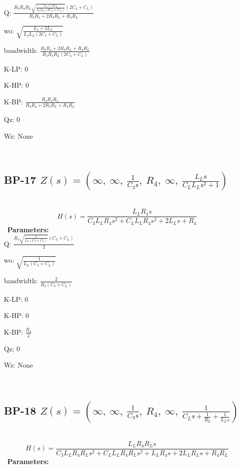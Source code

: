 \documentclass{article}
\begin{document}
Q: $\frac{R_{3} R_{4} R_{L} \sqrt{\frac{L_{4} + 2 L_{L}}{L_{4} L_{L} \left(2 C_{4} + C_{L}\right)}} \left(2 C_{4} + C_{L}\right)}{R_{3} R_{4} + 2 R_{3} R_{L} + R_{4} R_{L}}$\ 

wo: $\sqrt{\frac{L_{4} + 2 L_{L}}{L_{4} L_{L} \left(2 C_{4} + C_{L}\right)}}$\ 

bandwidth: $\frac{R_{3} R_{4} + 2 R_{3} R_{L} + R_{4} R_{L}}{R_{3} R_{4} R_{L} \left(2 C_{4} + C_{L}\right)}$\ 

K-LP: $0$\ 

K-HP: $0$\ 

K-BP: $\frac{R_{3} R_{4} R_{L}}{R_{3} R_{4} + 2 R_{3} R_{L} + R_{4} R_{L}}$\ 

Qz: $0$\ 

Wz: $\text{None}$\ 

\ 

\subsection{BP-17 $Z(s) = \left( \infty, \  \infty, \  \frac{1}{C_{3} s}, \  R_{4}, \  \infty, \  \frac{L_{L} s}{C_{L} L_{L} s^{2} + 1}\right)$ } \ 
\textbf{\[H(s) = \frac{L_{L} R_{4} s}{C_{3} L_{L} R_{4} s^{2} + C_{L} L_{L} R_{4} s^{2} + 2 L_{L} s + R_{4}}\] } \ 
\textbf{Parameters:}\\ 

Q: $\frac{R_{4} \sqrt{\frac{1}{L_{L} \left(C_{3} + C_{L}\right)}} \left(C_{3} + C_{L}\right)}{2}$\ 

wo: $\sqrt{\frac{1}{L_{L} \left(C_{3} + C_{L}\right)}}$\ 

bandwidth: $\frac{2}{R_{4} \left(C_{3} + C_{L}\right)}$\ 

K-LP: $0$\ 

K-HP: $0$\ 

K-BP: $\frac{R_{4}}{2}$\ 

Qz: $0$\ 

Wz: $\text{None}$\ 

\ 

\subsection{BP-18 $Z(s) = \left( \infty, \  \infty, \  \frac{1}{C_{3} s}, \  R_{4}, \  \infty, \  \frac{1}{C_{L} s + \frac{1}{R_{L}} + \frac{1}{L_{L} s}}\right)$ } \ 
\textbf{\[H(s) = \frac{L_{L} R_{4} R_{L} s}{C_{3} L_{L} R_{4} R_{L} s^{2} + C_{L} L_{L} R_{4} R_{L} s^{2} + L_{L} R_{4} s + 2 L_{L} R_{L} s + R_{4} R_{L}}\] } \ 
\textbf{Parameters:}\\ 
\end{document}
